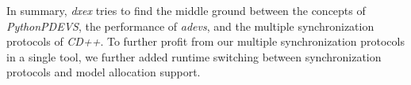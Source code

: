 In summary, \textit{dxex} tries to find the middle ground between the concepts of \textit{PythonPDEVS}, the performance of \textit{adevs}, and the multiple synchronization protocols of \textit{CD++}.
To further profit from our multiple synchronization protocols in a single tool, we further added runtime switching between synchronization protocols and model allocation support.
